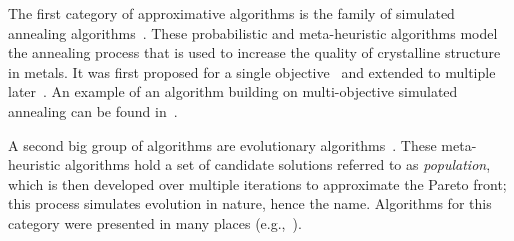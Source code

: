 The first category of approximative algorithms is the family of simulated annealing algorithms~\autocite{Saini2021}.
These probabilistic and meta-heuristic algorithms model the annealing process that is used to increase the quality of crystalline structure in metals.
It was first proposed for a single objective~\autocite{DBLP:journals/science/KirkpatrickGV83} and extended to multiple later~\autocite{DBLP:journals/tec/BandyopadhyaySMD08}.
An example of an algorithm building on multi-objective simulated annealing can be found in~\textcite{DBLP:journals/isci/SenguptaS18}.

A second big group of algorithms are evolutionary algorithms~\autocites{Saini2021,DBLP:books/daglib/0087893}.
These meta-heuristic algorithms hold a set of candidate solutions referred to as \emph{population}, which is then developed over multiple iterations to approximate the Pareto front;
this process simulates evolution in nature, hence the name.
Algorithms for this category were presented in many places (e.g.,~\autocites{DBLP:journals/jgo/StornP97,DBLP:journals/tec/DebAPM02}).